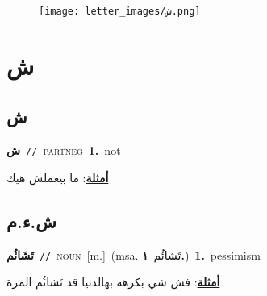 \documentclass[10pt,a4paper,twoside]{article} %
\begin{document}
\begin{figure*}[t!]\centering\texttt{[image: letter\_images/ش.png]}\end{figure*}
\color{white}

 \section*{\foreignlanguage{arabic}{ش}} 
 \begin{multicols}{2} 

%
\color{black}
\vspace{-3mm}
\subsection*{\color{blue}\foreignlanguage{arabic}{ش}\color{blue}{ (ntws)}} 

{\setlength\topsep{0pt}\textbf{\foreignlanguage{arabic}{ش}}\ {\color{gray}\texttt{//}\color{black}}\ \textsc{part\textunderscore neg}\ \textbf{1.}~not\  \begin{flushright}\color{gray}\foreignlanguage{arabic}{\textbf{\underline{\foreignlanguage{arabic}{أمثلة}}}: ما بيعملش هيك}\end{flushright}\color{black}} \vspace{2mm}

\vspace{-3mm}
\subsection*{\color{blue}\foreignlanguage{arabic}{ش.ء.م}\color{blue}{}} 

{\setlength\topsep{0pt}\textbf{\foreignlanguage{arabic}{تَشَائُم}}\ {\color{gray}\texttt{//}\color{black}}\ \textsc{noun}\ [m.]\ \color{gray}(msa. \foreignlanguage{arabic}{تَشائُم}~\foreignlanguage{arabic}{\textbf{١.}})\color{black}\ \textbf{1.}~pessimism\  \begin{flushright}\color{gray}\foreignlanguage{arabic}{\textbf{\underline{\foreignlanguage{arabic}{أمثلة}}}: فش شي بكرهه بهالدنيا قد تَشائُم المرة}\end{flushright}\color{black}} \vspace{2mm}


\end{multicols}
\end{document}
